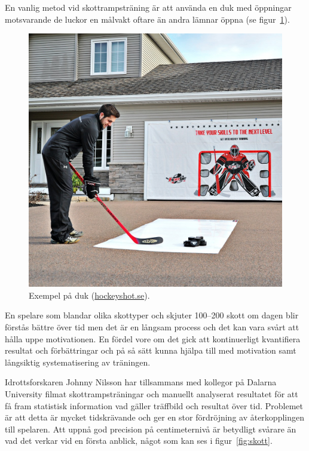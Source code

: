 \documentclass[a4paper,12pt]{report}
\begin{document}
En vanlig metod vid skottrampsträning är att använda en duk med öppningar
motsvarande de luckor en målvakt oftare än andra lämnar öppna (se
figur~\ref{fig:duk}).

\begin{figure}[ht]
  \centering
  \includegraphics[width=\linewidth]{photos/shooting-tarp.jpg}
  \caption{Exempel på duk
  (\href{http://www.hockeyshot.se/HockeyShot-Extreme-Shooting-Tarp-p/target-tarp-032.htm}{hockeyshot.se}).
  \label{fig:duk}}
\end{figure}

En spelare som blandar olika skottyper och skjuter 100--200 skott om dagen
blir förstås bättre över tid men det är en långsam process och det kan vara
svårt att hålla uppe motivationen. En fördel vore om det gick att
kontinuerligt kvantifiera resultat och förbättringar och på så sätt kunna
hjälpa till med motivation samt långsiktig systematisering av träningen.

Idrottsforskaren Johnny Nilsson har tillsammans med kollegor på Dalarna
University filmat skottrampsträningar och manuellt analyserat resultatet
för att få fram statistisk information vad gäller träffbild och resultat
över tid. Problemet är att detta är mycket tidskrävande och ger en stor
fördröjning av återkopplingen till spelaren. Att uppnå god precision på
centimeternivå är betydligt svårare än vad det verkar vid en första anblick,
något som kan ses i figur~\ref{fig:skott}.
\end{document}
